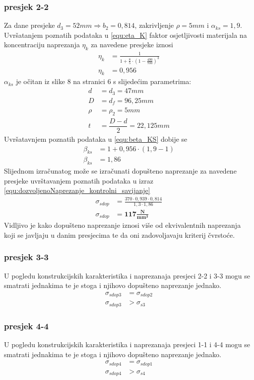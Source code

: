\documentclass[11pt,a4paper]{article}
\begin{document}
\subsubsection*{presjek 2-2}
Za dane presjeke $d_3=52mm \Rightarrow b_2=0,814$, zakrivljenje $\rho=5mm$ i $\alpha_{ks}=1,9$.
Uvršatanjem poznatih podataka u \eqref{equ:eta_K} faktor osjetljivosti materijala na koncentraciju naprezanja $\eta_k$ za navedene presjeke iznosi
\begin{align*}
\eta_k&=\frac{1}{1+\frac{8}{5} \cdot \left( 1- \frac{490}{700} \right)^3}\\
\eta_k&=0,956
\end{align*}
$\alpha_{ks}$ je očitan iz slike 8 na stranici 6 s slijedećim parametrima:
\begin{align*}
d&=d_3=47mm\\
D&=d_f=96,25mm\\
\rho&=\rho_2=5mm\\
t&=\dfrac{D-d}{2}=22,125mm
\end{align*}
Uvršatavnjem poznatih podataka u \eqref{equ:beta_KS} dobije se
\begin{align*}
\beta_{ks}&=1+ 0,956 \cdot (1,9-1)\\
\beta_{ks}&=1,86
\end{align*}
Slijednom izračunatog može se izračunati dopušteno naprezanje za navedene presjeke uvrštavanjem poznatih podataka u izraz \eqref{equ:dozvoljenoNaprezanje_kontrolni_savijanje}
\begin{align*}
\sigma_{sdop}&=\frac{370 \cdot 0,939 \cdot 0,814}{1,3 \cdot 1,86}\\
\sigma_{sdop}&=\mathbf{117\textstyle\frac{N}{mm^2}}
\end{align*}
Vidljivo je kako dopušteno naprezanje iznosi više od ekvivalentnih naprezanja koji se javljaju u danim presjecima te da oni zadovoljavaju kriterij čvrstoće.

\subsubsection*{presjek 3-3}
U pogledu konstrukcijskih karakteristika i naprezanaja presjeci 2-2 i 3-3 mogu se smatrati jednakima te je stoga i njihovo dopušteno naprezanje jednako.
\begin{align*}
\sigma_{sdop3}&=\sigma_{sdop2}\\
\sigma_{sdop3}&>\sigma_{s3}
\end{align*}

\subsubsection*{presjek 4-4}
U pogledu konstrukcijskih karakteristika i naprezanaja presjeci 1-1 i 4-4 mogu se smatrati jednakima te je stoga i njihovo dopušteno naprezanje jednako.
\begin{align*}
\sigma_{sdop4}&=\sigma_{sdop1}\\
\sigma_{sdop4}&>\sigma_{s4}
\end{align*}
\end{document}
